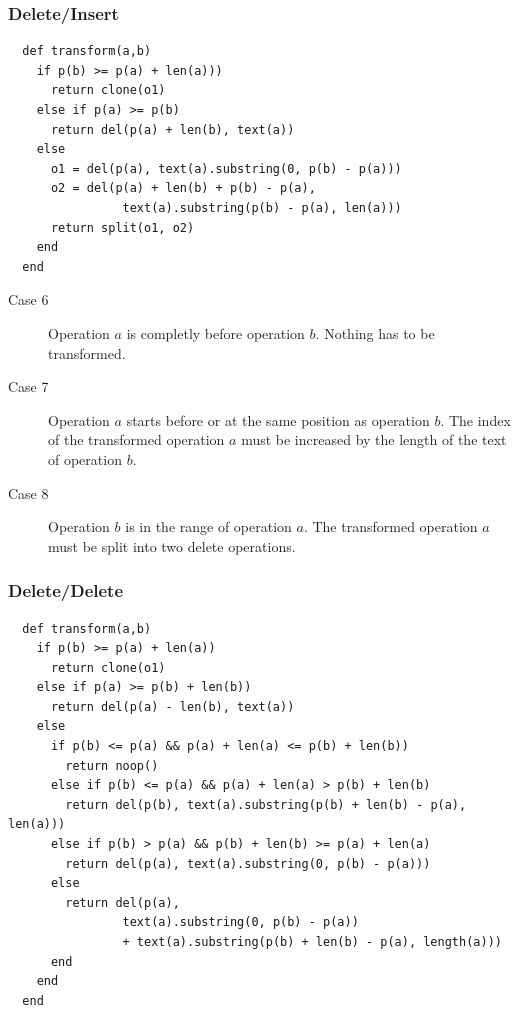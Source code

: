 \subsubsection{Delete/Insert}

\small{\begin{verbatim}
  def transform(a,b)
    if p(b) >= p(a) + len(a)))
      return clone(o1)
    else if p(a) >= p(b)
      return del(p(a) + len(b), text(a))
    else
      o1 = del(p(a), text(a).substring(0, p(b) - p(a)))
      o2 = del(p(a) + len(b) + p(b) - p(a), 
                text(a).substring(p(b) - p(a), len(a)))
      return split(o1, o2)
    end
  end
\end{verbatim}}

\begin{description}
 \item[Case 6] Operation $a$ is completly before operation $b$. Nothing has to be transformed.
 \item[Case 7] Operation $a$ starts before or at the same position as operation $b$. The index of the transformed operation $a$ must be increased by the length of the text of operation $b$.
 \item[Case 8] Operation $b$ is in the range of operation $a$. The transformed operation $a$ must be split into two delete operations.
\end{description}


\subsubsection{Delete/Delete}

\small{\begin{verbatim}
  def transform(a,b)
    if p(b) >= p(a) + len(a))
      return clone(o1)
    else if p(a) >= p(b) + len(b))
      return del(p(a) - len(b), text(a))
    else
      if p(b) <= p(a) && p(a) + len(a) <= p(b) + len(b))
        return noop()
      else if p(b) <= p(a) && p(a) + len(a) > p(b) + len(b)
        return del(p(b), text(a).substring(p(b) + len(b) - p(a), len(a)))
      else if p(b) > p(a) && p(b) + len(b) >= p(a) + len(a)
        return del(p(a), text(a).substring(0, p(b) - p(a)))
      else
        return del(p(a), 
                text(a).substring(0, p(b) - p(a)) 
                + text(a).substring(p(b) + len(b) - p(a), length(a)))
      end
    end
  end
\end{verbatim}}

